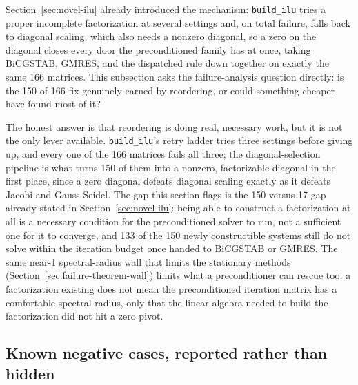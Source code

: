 \documentclass[11pt,a4paper]{article}
\newcommand{\code}[1]{\texttt{\footnotesize #1}}
\begin{document}
Section~\ref{sec:novel-ilu} already introduced the mechanism: \code{build\_ilu} tries a
proper incomplete factorization at several settings and, on total failure, falls back to
diagonal scaling, which also needs a nonzero diagonal, so a zero on the diagonal closes
every door the preconditioned family has at once, taking BiCGSTAB, GMRES, and the
dispatched rule down together on exactly the same 166 matrices. This subsection asks the
failure-analysis question directly: is the 150-of-166 fix genuinely earned by reordering,
or could something cheaper have found most of it?

The honest answer is that reordering is doing real, necessary work, but it is not the only
lever available. \code{build\_ilu}'s retry ladder tries three settings before giving up,
and every one of the 166 matrices fails all three; the diagonal-selection pipeline is what
turns 150 of them into a nonzero, factorizable diagonal in the first place, since a zero
diagonal defeats diagonal scaling exactly as it defeats Jacobi and Gauss-Seidel. The gap
this section flags is the 150-versus-17 gap already stated in Section~\ref{sec:novel-ilu}:
being able to construct a factorization at all is a necessary condition for the
preconditioned solver to run, not a sufficient one for it to converge, and 133 of the 150
newly constructible systems still do not solve within the iteration budget once handed to
BiCGSTAB or GMRES. The same near-1 spectral-radius wall that limits the stationary methods
(Section~\ref{sec:failure-theorem-wall}) limits what a preconditioner can rescue too: a
factorization existing does not mean the preconditioned iteration matrix has a comfortable
spectral radius, only that the linear algebra needed to build the factorization did not
hit a zero pivot.

\subsection{Known negative cases, reported rather than hidden}
\label{sec:failure-negatives}
\end{document}
